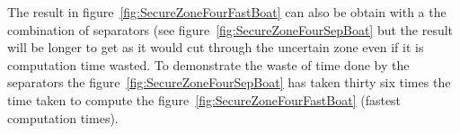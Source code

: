 The result in figure~\ref{fig:SecureZoneFourFastBoat} can also be obtain with a the combination of separators (see figure~\ref{fig:SecureZoneFourSepBoat} but the result will be longer to get as it would cut through the uncertain zone even if it is computation time wasted. To demonstrate the waste of time done by the separators the figure~\ref{fig:SecureZoneFourSepBoat} has taken thirty six times the time taken to compute the figure~\ref{fig:SecureZoneFourFastBoat} (fastest computation times).